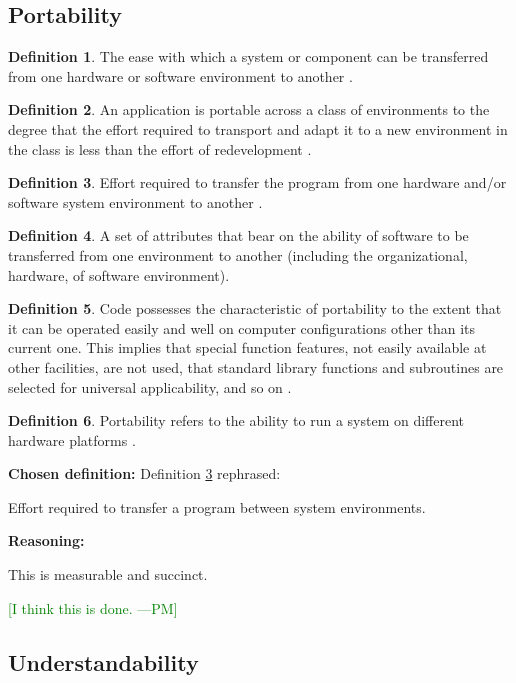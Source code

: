 \documentclass[letterpaper,cleveref]{lipics-v2019}
\newcommand{\authornote}[3]{\textcolor{#1}{[#3 ---#2]}}
\newcommand{\authornote}[3]{}
\newcommand{\pmi}[1]{\authornote{green}{PM}{#1}} %
\theoremstyle{definition}
\newtheorem{defn}{Definition}
\begin{document}
\subsection{Portability}
\begin{defn}
The ease with which a system or component can be transferred from one hardware or software environment to another \citep{IEEEStdGlossarySET1990}.
\end{defn}
\begin{defn}
An application is portable across a class of environments to the degree that the effort required to transport and adapt it to a new environment in the class is less than the effort of redevelopment \citep{mooney1990strategies}.
\end{defn}
\begin{defn} \label{PortabilityDefnSelected}
Effort required to transfer the program from one hardware and/or software system environment to another \citep{pressman2005software}.
\end{defn}
\begin{defn}
A set of attributes that bear on the ability of software to be transferred from one environment to another (including the organizational, hardware, of software environment)\citep{pfleeger2006software}.
\end{defn}
\begin{defn}
Code possesses the characteristic of portability to the extent that it can be operated easily and well on computer configurations other than its current one. This implies that special function features, not easily available at other facilities, are not used, that standard library functions and subroutines are selected for universal applicability, and so on \citep{boehm2007software}.
\end{defn}
\begin{defn}
Portability refers to the ability to run a system on different hardware platforms \citep{ghezzi1991fundamentals}.
\end{defn}

\noindent \textbf{Chosen definition:} Definition \ref{PortabilityDefnSelected} rephrased:

Effort required to transfer a program between system environments.

\noindent \textbf{Reasoning:}

This is measurable and succinct. 

\pmi{I think this is done.}

 

\subsection{Understandability}
\end{document}
